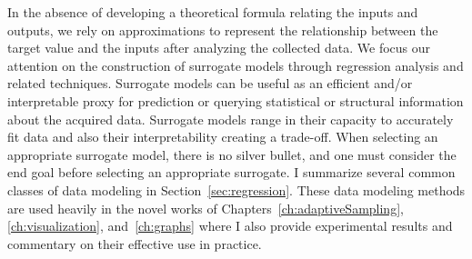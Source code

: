 In the absence of developing a theoretical formula relating the inputs and outputs, we rely on approximations to represent the relationship between the target value and the inputs after analyzing the collected data.
%
We focus our attention on the construction of surrogate models through regression analysis and related techniques.
%
Surrogate models can be useful as an efficient and/or interpretable proxy for prediction or querying statistical or structural information about the acquired data.
%
Surrogate models range in their capacity to accurately fit data and also their interpretability creating a trade-off.
%
When selecting an appropriate surrogate model, there is no silver bullet, and one must consider the end goal before selecting an appropriate surrogate.
%
I summarize several common classes of data modeling in Section~\ref{sec:regression}. These data modeling methods are used heavily in the novel works of Chapters~\ref{ch:adaptiveSampling}, \ref{ch:visualization}, and~\ref{ch:graphs} where I also provide experimental results and commentary on their effective use in practice.

% 